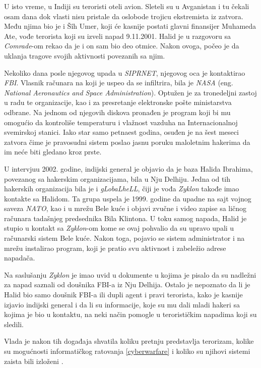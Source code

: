 \documentclass[a4paper]{article}
\begin{document}
U isto vreme, u Indiji su teroristi oteli avion. Sleteli su u Avganistan i tu čekali osam dana dok vlasti nisu pristale da oslobode trojicu ekstremista iz zatvora. Među njima bio je i Šîh Umer, koji će kasnije postati glavni finansijer Muhameda Ate, vođe terorista koji su izveli napad 9.11.2001. Halid je u razgovoru sa \textit{Comrade}-om rekao da je i on sam bio deo otmice. Nakon ovoga, počeo je da uklanja tragove svojih aktivnosti povezanih sa njim.

Nekoliko dana posle njegovog upada u \textit{SIPRNET}, njegovog oca je kontaktirao \textit{FBI}. Vlasnik računara na koji je uspeo da se infiltrira, bila je \textit{NASA} (eng. \textit{National Aeronautics and Space Administration}). Optužen je za tronedeljni 
zastoj u radu te organizacije, kao i za presretanje 
elektronske pošte ministarstva odbrane. Na jednom od 
njegovih diskova pronađen je program koji bi mu 
omogućio da kontroliše temperaturu i vlažnost vazduha 
na Internacionalnoj svemirskoj stanici. Iako star samo petnaest godina, osuđen je na šest meseci zatvora čime je pravosudni sistem poslao jasnu poruku maloletnim hakerima da im neće biti gledano kroz prste.

U intervjuu 2002. godine, indijski general je objavio da je baza Halida Ibrahima, povezanog sa hakerskim organizacijama, bila u Nju Delhiju. Jedna od tih hakerskih organizacija bila je i \textit{gLobaLheLL}, čiji je vođa \textit{Zyklon} takođe imao kontakte sa Halidom. Ta grupa uspela je 1999. godine da upadne na sajt vojnog saveza \textit{NATO}, kao i u mrežu Bele kuće i objavi zvučne i video zapise sa ličnog računara tadašnjeg predsednika Bila Klintona. U toku samog napada, Halid je stupio u kontakt sa \textit{Zyklon}-om kome se ovaj pohvalio da su upravo upali u računarski sistem Bele kuće. Nakon toga, pojavio se sistem administrator i na mrežu instalirao program, koji je pratio svu aktivnost i zabeležio adrese napadača.

Na saslušanju \textit{Zyklon} je imao uvid u dokumente u kojima je pisalo da su nadležni za napad saznali od doušnika FBI-a iz Nju Delhija. Ostalo je nepoznato da li je Halid bio samo doušnik FBI-a ili dupli agent i pravi terorista, kako je kasnije izjavio indijski general i da li su informacije, koje su mu dali mladi hakeri sa kojima je bio u kontaktu, na neki način pomogle u terorističkim napadima koji su sledili. 

Vlada je nakon tih događaja shvatila koliku pretnju predstavlja terorizam, kolike su mogućnosti informatičkog ratovanja \ref{cyberwarfare} i koliko su njihovi sistemi zaista bili izloženi \cite{intrusion}.
\end{document}
